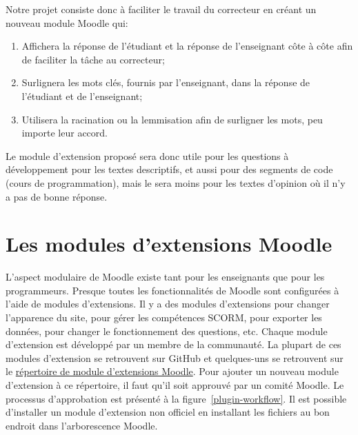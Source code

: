 Notre projet consiste donc à faciliter le travail du correcteur en créant un nouveau module Moodle qui:

\begin{enumerate}
  \item Affichera la réponse de l'étudiant et la réponse de l'enseignant côte à côte afin de faciliter la tâche au correcteur;
  \item Surlignera les mots clés, fournis par l'enseignant, dans la réponse de l'étudiant et de l'enseignant;
  \item Utilisera la racination ou la lemmisation afin de surligner les mots, peu importe leur accord.
\end{enumerate}

Le module d'extension propos\'e sera donc utile pour les questions à développement pour les textes descriptifs, et aussi pour des segments de code (cours  de programmation), mais le sera moins pour les textes d'opinion où il n'y a pas de \og bonne \fg{} réponse.

\section{Les modules d'extensions Moodle}


L'aspect modulaire de Moodle existe tant pour les enseignants que pour les programmeurs.
Presque toutes les fonctionnalités de Moodle sont configurées à l'aide de modules d'extensions.
Il y a des modules d'extensions pour changer l'apparence du site, pour gérer les compétences SCORM, pour exporter les données, pour changer le fonctionnement des questions, etc.
Chaque module d'extension est développé par un membre de la communauté.
La plupart de ces modules d'extension se retrouvent sur GitHub et quelques-uns se retrouvent sur le \href{https://moodle.org/plugins/}{répertoire de module d'extensions Moodle}.
Pour ajouter un nouveau module d'extension à ce répertoire, il faut qu'il soit approuvé par un comité Moodle.
Le processus d'approbation est pr\'esent\'e à la figure~\ref{plugin-workflow}.
Il est possible d'installer un module d'extension non officiel en installant les fichiers au bon endroit dans l'arborescence Moodle.

